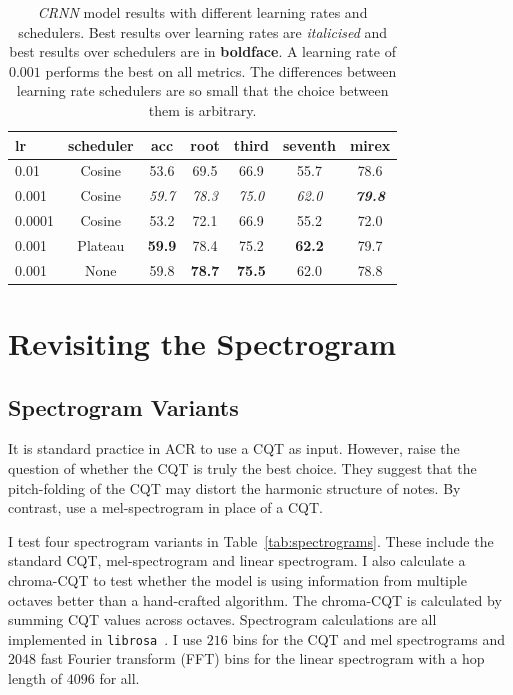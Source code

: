 \begin{table}[H]
    \centering
    \begin{tabular}{lcccccc}
        \toprule
        lr & scheduler & acc & root & third & seventh & mirex \\
        \midrule
        0.01 & Cosine &  53.6 & 69.5 & 66.9 & 55.7 & 78.6 \\
        0.001 & Cosine & \emph{59.7} & \emph{78.3} & \emph{75.0} & \emph{62.0} & \emph{\textbf{79.8}} \\
        0.0001 & Cosine & 53.2 & 72.1 & 66.9 & 55.2 & 72.0 \\
        \midrule
        0.001 & Plateau & \textbf{59.9} & 78.4 & 75.2 & \textbf{62.2} & 79.7 \\
        0.001 & None & 59.8 & \textbf{78.7} &\textbf{75.5} & 62.0 & 78.8 \\
        \bottomrule
    \end{tabular}
    \caption{\emph{CRNN} model results with different learning rates and schedulers. Best results over learning rates are \emph{italicised} and best results over schedulers are in \textbf{boldface}. A learning rate of $0.001$ performs the best on all metrics. The differences between learning rate schedulers are so small that the choice between them is arbitrary. }\label{tab:crnn_lr}
\end{table}

\section{Revisiting the Spectrogram}\label{sec:spectrogram-results}

\subsection{Spectrogram Variants}\label{sec:spectrogram-variants}

It is standard practice in ACR to use a CQT as input. However, \citet{20YearsofACR} raise the question of whether the CQT is truly the best choice. They suggest that the pitch-folding of the CQT may distort the harmonic structure of notes. By contrast, \citet{MelodyTranscriptionViaGenerativePreTraining} use a mel-spectrogram in place of a CQT. 

I test four spectrogram variants in Table~\ref{tab:spectrograms}. These include the standard CQT, mel-spectrogram and linear spectrogram. I also calculate a chroma-CQT to test whether the model is using information from multiple octaves better than a hand-crafted algorithm. The chroma-CQT is calculated by summing CQT values across octaves. Spectrogram calculations are all implemented in \texttt{librosa}~\citep{librosa}. I use $216$ bins for the CQT and mel spectrograms and $2048$ fast Fourier transform (FFT) bins for the linear spectrogram with a hop length of $4096$ for all. 

